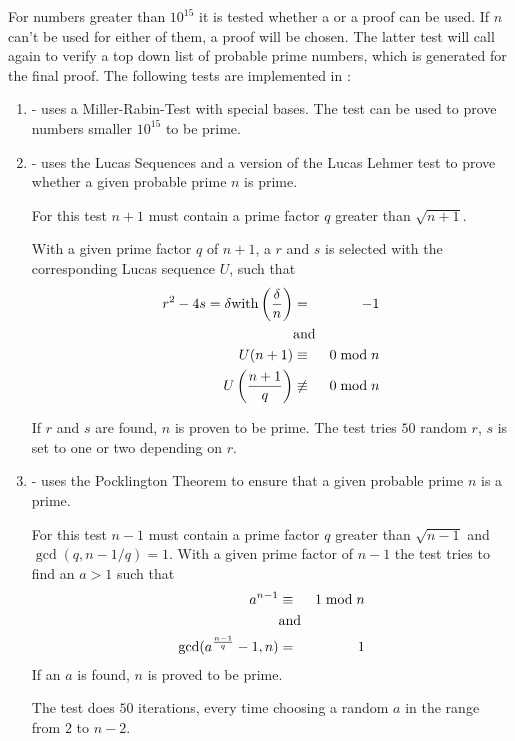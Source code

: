 For numbers greater than $10^{15}$ it is tested whether a  or a 
proof can be used. If $n$ can't be used for either of them, a  proof will
be chosen.
The latter test will call  again to verify a top down list of probable prime numbers,
which is generated for the final proof.
The following tests are implemented in :
\begin{enumerate}

\item {} - uses a Miller-Rabin-Test with special bases.
The test can be used to prove numbers smaller $10^{15}$ to be prime.

\item {} - uses the Lucas Sequences and a version of the Lucas Lehmer test to prove whether
a given probable prime $n$ is prime.

For this test $n+1$ must contain a prime factor $q$ greater than $\sqrt{n+1}$.

With a given prime factor $q$ of $n+1$, a $r$ and $s$ is selected with the corresponding
Lucas sequence $U$, such that
\begin{eqnarray*}
r^2 - 4s = \delta
{\rm with}
\left( \frac{\delta}{n} \right) &=& -1 \\
&{\rm and}&\\
U(n+1) &\equiv& 0 \bmod n\\
U\left( \frac{n+1}{q} \right) &\not\equiv& 0 \bmod n
\end{eqnarray*}

If $r$ and $s$ are found, $n$ is proven to be prime.
The test tries $50$ random $r$, $s$ is set to one or two depending on $r$.

\item {} -  uses the Pocklington Theorem to ensure that
a given probable prime $n$ is a prime.

For this test $n-1$ must contain a prime factor $q$ greater than $\sqrt{n-1}$ and $\gcd(q,n-1/q)=1$.
With a given prime factor of $n-1$ the test tries to find an $a > 1$ such that
\begin{eqnarray*}
a^{n-1} &\equiv& 1 \bmod n \\
&{\rm and}& \\
\gcd(a^{\frac{n-1}{q}}-1,n) &=& 1
\end{eqnarray*}
If an $a$ is found, $n$ is proved to be prime.

The test does $50$ iterations, every time choosing a random $a$ in the range from $2$ to $n-2$.


\end{enumerate}
